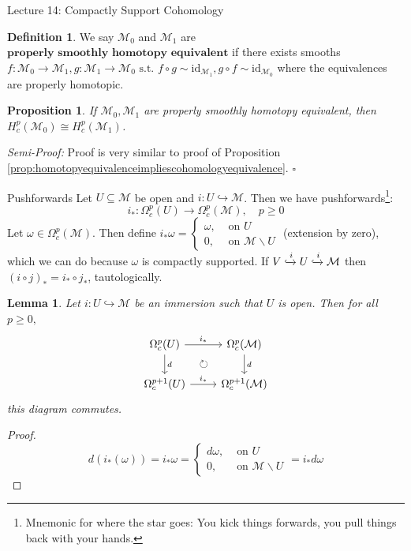 \documentclass[10pt]{article}
\theoremstyle{plain}
\newtheorem{lemma}[thm]{Lemma}
\newtheorem{prop}[thm]{Proposition}
\theoremstyle{definition}
\newtheorem{defn}[thm]{Definition} %
\newenvironment{semiproof}{\textit{Semi-Proof:}}{\hfill$\square$}
\newcommand{\st}{\text{ s.t. }}
\newcommand{\id}{\text{id}}
\newcommand{\man}{\mathcal{M}}
\newcommand{\compactpformman}[1]{\Omega^{#1}_c(\man)}
\newcommand{\deriv}{d}
\newcommand{\dw}{d\omega}
\begin{document}
\begin{section}{Lecture 14: Compactly Support Cohomology}
\begin{defn}
We say $\man_0$ and $\man_1$ are $\textbf{properly smoothly homotopy equivalent}$ if there exists smooths $f: \man_0 \to \man_1, g: \man_1 \to \man _0  \st f\circ g \sim \id_{\man_1}, g\circ f \sim \id_{\man_0}$ where the equivalences are properly homotopic. 
\end{defn}
\begin{prop}
If $\man_0,\man_1$ are properly smoothly homotopy equivalent, then $H^p_c(\man_0) \cong H^p_c(\man_1)$.
\end{prop}
\begin{semiproof}
Proof is very similar to proof of Proposition \ref{prop:homotopyequivalenceimpliescohomologyequivalence}.
\end{semiproof}
\begin{subsection}{Pushforwards}
Let $U\subseteq \man$ be open and $i : U\hookrightarrow \man$. Then we have pushforwards\footnote{Mnemonic for where the star goes: You kick things forwards, you pull things back with your hands.}:
$$i_* : \Omega_c^p(U) \to \compactpformman{p}, \quad p \geq 0$$
Let $\omega \in \compactpformman{p}$. Then define $i_* \omega = \begin{cases}\omega, & \text{ on } U\\ 0, & \text{ on } \man \backslash U \end{cases}$ (extension by zero), which we can do because $\omega$ is compactly supported. If $V \xhookrightarrow{i} U \xhookrightarrow{i} \man$ then $(i \circ j )_* = i_* \circ j_*$, tautologically.
\end{subsection}
\begin{lemma}
Let $i : U \hookrightarrow \man $ be an immersion such that $U$ is open. Then for all $p \geq 0,$
$$%
\begin{tikzcd}
\Omega _c ^p (U)  \arrow[r, "i_*"] \arrow[d, "d"]  \arrow[dr,phantom,"\circlearrowright"]& \Omega_c^p(\mathcal{M}) \arrow[d, "d"] \\
\Omega_c^{p+1}(U) \arrow[r, "i_*"]                & \Omega_c^{p+1}(\mathcal{M})           
\end{tikzcd}$$
this diagram commutes.
\end{lemma}
\begin{proof}
$$\deriv(i_*(\omega))= i_* \omega = \begin{cases}\deriv\omega, & \text{ on } U\\ 0, & \text{ on } \man \backslash U \end{cases} = i_* \dw$$

\end{proof}
\end{section}
\end{document}

